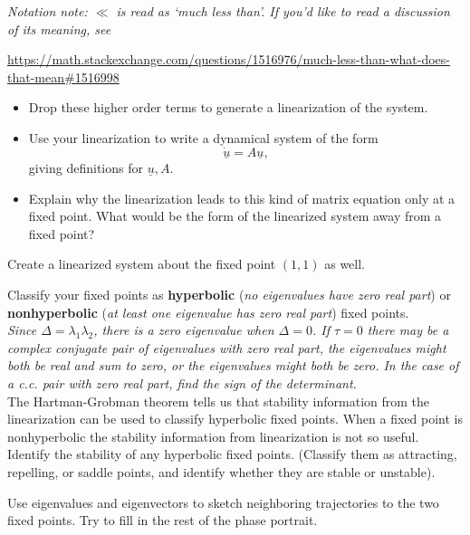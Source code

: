\documentclass[12pt,letterpaper,noanswers]{exam}
\begin{document}
\begin{questions}
\begin{parts}
\emph{Notation note: $\ll$ is read as `much less than'.  If you'd like to read a discussion of its meaning, see}

\small{\url{https://math.stackexchange.com/questions/1516976/much-less-than-what-does-that-mean#1516998}}
\begin{itemize}
\item Drop these higher order terms to generate a linearization of the system.  
\item Use your linearization to write a dynamical system of the form \[\dot{\underline{u}} = A \underline{u},\] giving definitions for $\underline{u}, A$. \\
\item Explain why the linearization leads to this kind of matrix equation only at a fixed point.  What would be the form of the linearized system away from a fixed point?
\end{itemize}

\item Create a linearized system about the fixed point $(1,1)$ as well.
\item Classify your fixed points as  \textbf{hyperbolic} (\emph{no eigenvalues have zero real part}) or \textbf{nonhyperbolic} 
 (\emph{at least one eigenvalue has zero real part}) fixed points.  \\ 
 
 \emph{Since $\Delta = \lambda_1\lambda_2$, there is a zero eigenvalue when $\Delta = 0$.  If $\tau = 0$ there may be a complex conjugate pair of eigenvalues with zero real part, the eigenvalues might both be real and sum to zero, or the eigenvalues might both be zero.  In the case of a c.c. pair with zero real part, find the sign of the determinant.} \\
 
The Hartman-Grobman theorem tells us that stability information from the linearization can be used to classify hyperbolic fixed points.  When a fixed point is nonhyperbolic the stability information from linearization is not so useful.
 \\

Identify the stability of any hyperbolic fixed points.  (Classify them as attracting, repelling, or saddle points, and identify whether they are stable or unstable).
 
  \item Use eigenvalues and eigenvectors to sketch neighboring trajectories to the two fixed points.  Try to fill in the rest of the phase portrait.  \\
  

\end{parts}
\end{questions}
\end{document}
